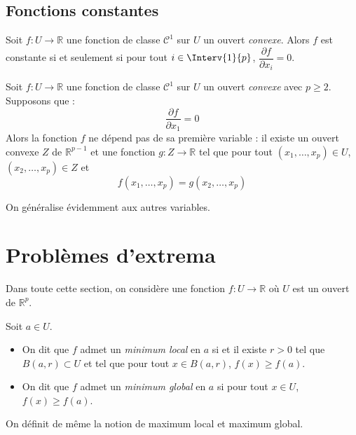 \documentclass[a4paper,10pt]{report}
\begin{document}
\vspace{7cm}

\newpage

\subsection{Fonctions constantes}

\begin{prop} Soit $f : U \rightarrow \mathbb{R}$ une fonction de classe $\mathcal{C}^1$ sur $U$ un ouvert \textit{convexe}. Alors $f$ est constante si et seulement si pour tout $i \in \Interv{1}{p}$, $\dfrac{\partial f}{\partial x_i}=0$.
\end{prop}

\begin{prop} Soit $f : U \rightarrow \mathbb{R}$ une fonction de classe $\mathcal{C}^1$ sur $U$ un ouvert \textit{convexe} avec $p \geq 2$. Supposons que :
$$ \dfrac{\partial f }{\partial x_1} = 0$$
Alors la fonction $f$ ne \og dépend pas \fg{} de sa première variable : il existe un ouvert convexe $Z$ de $\mathbb{R}^{p-1}$ et une fonction $g : Z \rightarrow \mathbb{R}$ tel que pour tout $(x_1, \ldots, x_p) \in U$, $(x_2, \ldots,x_p) \in Z$ et 
$$f(x_1, \ldots, x_p) = g(x_2, \ldots, x_p) $$
\end{prop}

\begin{rem} On généralise évidemment aux autres variables.
\end{rem}

\section{Problèmes d'extrema}
\noindent Dans toute cette section, on considère une fonction $f : U \rightarrow \mathbb{R}$ où $U$ est un ouvert de $\mathbb{R}^p$.

\begin{defin} Soit $a \in U$.
\begin{itemize}
\item On dit que $f$ admet un \textit{minimum local} en $a$ si et il existe $r >0$ tel que $B(a,r) \subset U$ et tel que pour tout $x \in B(a,r)$, $f(x) \geq f(a)$.
\item On dit que $f$ admet un \textit{minimum global} en $a$ si pour tout $x \in U$, $f(x) \geq f(a)$.
\end{itemize}
\end{defin}

\begin{rem} On définit de même la notion de maximum local et maximum global.
\end{rem}
\end{document}
